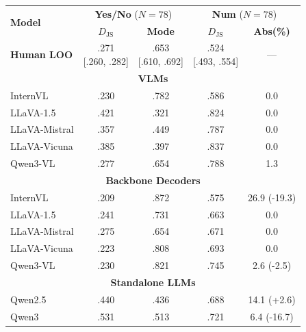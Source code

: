 \begin{table}[t]
\centering
\small
\setlength{\tabcolsep}{2.2pt}
\renewcommand{\arraystretch}{0.95p}
\begin{tabular}{lcc@{\hspace{6pt}}cc}
\toprule
\multirow{2}{*}{\textbf{Model}} &
\multicolumn{2}{c}{\textbf{Yes/No} ($N{=}78$)} &
\multicolumn{2}{c}{\textbf{Num} ($N{=}78$)} \\
\cmidrule(lr){2-3}\cmidrule(lr){4-5}
& \textbf{$D_{\mathrm{JS}}$} & \textbf{Mode} & \textbf{$D_{\mathrm{JS}}$} & \textbf{Abs(\%)} \\
\midrule
\textbf{Human LOO} & \makecell[c]{.271 \\ {\scriptsize[.260, .282]}} & \makecell[c]{.653 \\ {\scriptsize[.610, .692]}} & \makecell[c]{.524 \\ {\scriptsize[.493, .554]}} & --- \\
\midrule
\multicolumn{5}{c}{\textbf{VLMs}} \\
\midrule
InternVL & \cellcolor[HTML]{F7EBD9}.230 & \cellcolor[HTML]{F7EBD9}.782 & .586 & 0.0 \\
LLaVA-1.5 & .421 & .321 & .824 & 0.0 \\
LLaVA-Mistral & .357 & .449 & .787 & 0.0 \\
LLaVA-Vicuna & .385 & .397 & .837 & 0.0 \\
Qwen3-VL & \cellcolor[HTML]{D9EAF3}.277 & \cellcolor[HTML]{D9EAF3}.654 & .788 & 1.3 \\
\midrule
\multicolumn{5}{c}{\textbf{Backbone Decoders}} \\
\midrule
InternVL & \cellcolor[HTML]{F7EBD9}.209 & \cellcolor[HTML]{F7EBD9}.872 & .575 & 26.9 {(\textcolor[HTML]{0072B2}{-19.3})} \\
LLaVA-1.5 & \cellcolor[HTML]{F7EBD9}.241 & \cellcolor[HTML]{F7EBD9}.731 & .663 & 0.0 \\
LLaVA-Mistral & \cellcolor[HTML]{D9EAF3}.275 & \cellcolor[HTML]{D9EAF3}.654 & .671 & 0.0 \\
LLaVA-Vicuna & \cellcolor[HTML]{F7EBD9}.223 & \cellcolor[HTML]{F7EBD9}.808 & .693 & 0.0 \\
Qwen3-VL & \cellcolor[HTML]{F7EBD9}.230 & \cellcolor[HTML]{F7EBD9}.821 & .745 & 2.6 {(\textcolor[HTML]{0072B2}{-2.5})} \\
\midrule
\multicolumn{5}{c}{\textbf{Standalone LLMs}} \\
\midrule
Qwen2.5 & .440 & .436 & .688 & 14.1 {(\textcolor[HTML]{CC7A00}{+2.6})} \\
Qwen3 & .531 & .513 & .721 & 6.4 {(\textcolor[HTML]{0072B2}{-16.7})} \\

\end{tabular}
\end{table}
